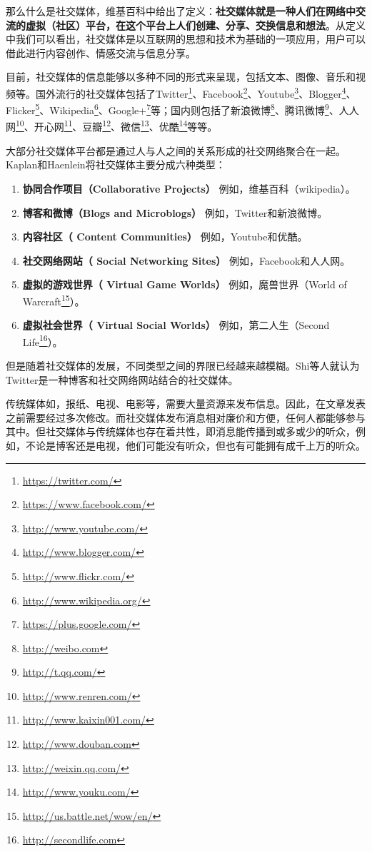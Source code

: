 那么什么是社交媒体，维基百科中给出了定义：\textbf{社交媒体就是一种人们在网络中交流的虚拟（社区）平台，在这个平台上人们创建、分享、交换信息和想法}。从定义中我们可以看出，社交媒体是以互联网的思想和技术为基础的一项应用，用户可以借此进行内容创作、情感交流与信息分享。

目前，社交媒体的信息能够以多种不同的形式来呈现，包括文本、图像、音乐和视频等。国外流行的社交媒体包括了Twitter\footnote{\url{https://twitter.com/}}、Facebook\footnote{\url{https://www.facebook.com/}}、Youtube\footnote{\url{http://www.youtube.com/}}、Blogger\footnote{\url{http://www.blogger.com/}}、Flicker\footnote{\url{http://www.flickr.com/}}、Wikipedia\footnote{\url{http://www.wikipedia.org/}}、Google+\footnote{\url{https://plus.google.com/}}等；国内则包括了新浪微博\footnote{\url{http://weibo.com}}、腾讯微博\footnote{\url{http://t.qq.com/}}、人人网\footnote{\url{http://www.renren.com/}}、开心网\footnote{\url{http://www.kaixin001.com/}}、豆瓣\footnote{\url{http://www.douban.com}}、微信\footnote{\url{http://weixin.qq.com/}}、优酷\footnote{\url{http://www.youku.com/}}等等。

大部分社交媒体平台都是通过人与人之间的关系形成的社交网络聚合在一起。Kaplan和Haenlein将社交媒体主要分成六种类型：
  \begin{enumerate}
  \item  \textbf{协同合作项目（Collaborative Projects）} 例如，维基百科（wikipedia）。
  \item   \textbf{博客和微博（Blogs and Microblogs）} 例如，Twitter和新浪微博。
   \item  \textbf{内容社区（ Content Communities）} 例如，Youtube和优酷。
  \item  \textbf{社交网络网站（ Social Networking Sites）} 例如，Facebook和人人网。
 \item  \textbf{虚拟的游戏世界（ Virtual Game Worlds）} 例如，魔兽世界（World of Warcraft\footnote{\url{http://us.battle.net/wow/en/}}）。
  \item  \textbf{虚拟社会世界（ Virtual Social Worlds）} 例如，第二人生（Second Life\footnote{\url{http://secondlife.com}}）。
  \end{enumerate}  
但是随着社交媒体的发展，不同类型之间的界限已经越来越模糊。Shi等人就认为Twitter是一种博客和社交网络网站结合的社交媒体。

传统媒体如，报纸、电视、电影等，需要大量资源来发布信息。因此，在文章发表之前需要经过多次修改。而社交媒体发布消息相对廉价和方便，任何人都能够参与其中。但社交媒体与传统媒体也存在着共性，即消息能传播到或多或少的听众，例如，不论是博客还是电视，他们可能没有听众，但也有可能拥有成千上万的听众。

